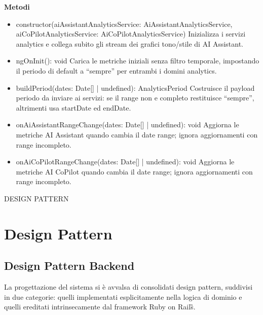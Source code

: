 \documentclass[a4paper,11pt]{article}
\begin{document}
\textbf{Metodi}
\begin{itemize}[noitemsep, topsep=0pt]
\item constructor(aiAssistantAnalyticsService: AiAssistantAnalyticsService, aiCoPilotAnalyticsService: AiCoPilotAnalyticsService)
Inizializza i servizi analytics e collega subito gli stream dei grafici tono/stile di AI Assistant.

\item ngOnInit(): void
Carica le metriche iniziali senza filtro temporale, impostando il periodo di default a ``sempre'' per entrambi i domini analytics.

\item buildPeriod(dates: Date[] | undefined): AnalyticsPeriod
Costruisce il payload periodo da inviare ai servizi: se il range non e completo restituisce ``sempre'', altrimenti usa startDate ed endDate.

\item onAiAssistantRangeChange(dates: Date[] | undefined): void
Aggiorna le metriche AI Assistant quando cambia il date range; ignora aggiornamenti con range incompleto.

\item onAiCoPilotRangeChange(dates: Date[] | undefined): void
Aggiorna le metriche AI CoPilot quando cambia il date range; ignora aggiornamenti con range incompleto.
\end{itemize}
DESIGN PATTERN 
\section{Design Pattern}
\subsection{Design Pattern Backend}

La progettazione del sistema si è avvalsa di consolidati design pattern,
suddivisi in due categorie: quelli implementati esplicitamente nella logica
di dominio e quelli ereditati intrinsecamente dal framework Ruby on Rails\G{}.
\end{document}
